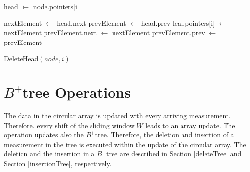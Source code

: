 \documentclass[abstracton,12pt,oneside]{scrreprt}
\begin{document}
\renewcommand*\footnoterule{}


\begin{algorithm}[H]
	\IncMargin{1em}
	\DontPrintSemicolon

	head $\leftarrow$ node.pointers[i]\;
	
	nextElement $\leftarrow$ head.next\; 
	prevElement $\leftarrow$ head.prev\; 
	\BlankLine
	leaf.pointers[i] $\leftarrow$  nextElement\;
	prevElement.next $\leftarrow$ nextElement\;
	prevElement.prev $\leftarrow$ prevElement\;


	\caption{DeleteHead$(node, i)$}
		\label{deleteListValue}
\end{algorithm}




\section{$B^+$tree Operations}
\label{sec:OperationsOnBTree}
The data in the circular array is updated with every arriving measurement. Therefore, every shift of the sliding window $W$ leads to an array update. The operation updates also the $B^+$tree. Therefore, the deletion and insertion of a measurement in the tree is executed within the update of the circular array. The deletion and the insertion in a $B^+$tree are described in Section \ref{deleteTree} and Section \ref{insertionTree}, respectively. 
\end{document}
